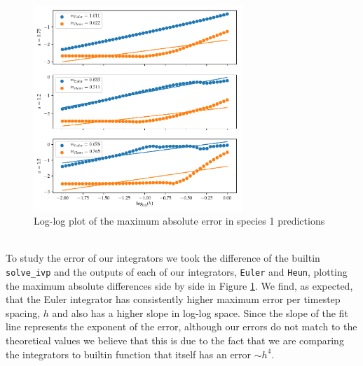 \documentclass[11pt, oneside]{article}   	%
\newcommand{\prob}[2]{
\indent \\
\noindent{\color{green!50!blue}\bf {\large#1.}}
{\normalfont #2}
}
\begin{document}
	\begin{figure}
		\centering
		\includegraphics[width=0.7\textwidth]{figs/err_fn.pdf}\vspace{-2mm}
		\caption{Log-log plot of the maximum absolute error in species 1 predictions}
		\label{error_fns}
	\end{figure}

\prob{3}{To study the error of our integrators we took the difference of the builtin \texttt{solve\_ivp} and the outputs of each of our integrators, \texttt{Euler} and \texttt{Heun}, plotting the maximum absolute differences side by side in Figure \ref{error_fns}. We find, as expected, that the Euler integrator has consistently higher maximum error per timestep spacing, $h$ and also has a higher slope in log-log space. Since the slope of the fit line represents the exponent of the error, although our errors do not match to the theoretical values we believe that this is due to the fact that we are comparing the integrators to builtin function that itself has an error $\sim h^4$. }
\end{document}
